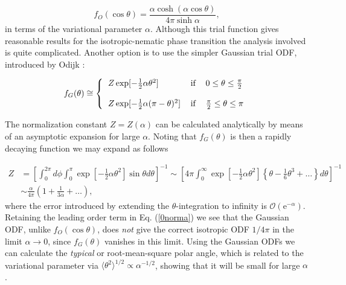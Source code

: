 \begin{equation}
f_{O}(\cos \theta) =\frac{\alpha \cosh (\alpha \cos\theta)}{4\pi\sinh \alpha},
\end{equation}
in terms of the variational parameter $\alpha$. Although this trial function gives reasonable results for the isotropic-nematic phase transition the analysis involved is
quite complicated. Another option is to use the simpler Gaussian trial ODF, introduced by Odijk \cite{OdijkLekkerkerker}:

\begin{equation}
f_{G}(\theta ) \cong   \left\{
\begin{tabular}{lll}
$Z\exp [-\frac{1}{2}\alpha\theta ^{2}]$ & if & $%
0\leq \theta \leq \frac{\pi }{2}$ \\
&  &  \\
$Z\exp [-\frac{1}{2}\alpha (\pi -\theta )^{2}]$
& if & $\frac{\pi}{2}\leq \theta \leq \pi $%
\end{tabular}
\right.  \label{0ODF}
\end{equation}

The normalization constant $Z=Z(\alpha)$ can be calculated analytically by means of an asymptotic expansion for large $\alpha$. Noting that $f_{G}(\theta)$ is then a rapidly decaying function we may expand as follows

\begin{align}
Z&=\left[\int_{0}^{2\pi} d \phi \int _{0}^{\pi} \exp \left[-\frac{1}{2}\alpha\theta ^{2}\right] \sin\theta d\theta\right]^{-1}
\sim \left[ 4\pi \int _{0}^{\infty} \exp \left[-\frac{1}{2}\alpha\theta ^{2}\right]\left\{ \theta - \frac{1}{6} \theta ^{3}+\ldots \right \}
 d\theta  \right]^{-1} \nonumber \\
&\sim \frac{\alpha}{4\pi}\left(1+\frac{1}{3\alpha}+\ldots \right), \label{0norma}
\end{align}
where the error introduced by extending  the $\theta$-integration  to infinity is $\mathcal{O}(\text{e}^{-\alpha})$. Retaining the leading order term in Eq. (\ref{0norma}) we see that the Gaussian ODF, unlike $f_{O}(\cos\theta)$, does {\em not} give the correct isotropic ODF $1/4\pi$ in the limit $\alpha \rightarrow 0$, since $f_{G}(\theta)$ vanishes in this limit. Using the Gaussian ODFs we can calculate the {\em typical} or root-mean-square polar angle, which is related to the variational parameter via $\langle\theta^{2}\rangle^{1/2}\propto  \alpha^{-1/2}$, showing that it will be small for large $\alpha$.

